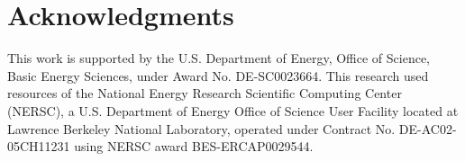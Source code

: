 \documentclass[10pt,a4paper,twocolumn]{article}
\begin{document}
\section{Acknowledgments}
This work is supported by the U.S. Department of Energy, Office of Science, Basic Energy Sciences, under Award No. DE-SC0023664. This research used resources of the National Energy Research Scientific Computing Center (NERSC), a U.S. Department of Energy Office of Science User Facility located at Lawrence Berkeley National Laboratory, operated under Contract No. DE-AC02-05CH11231 using NERSC award BES-ERCAP0029544.


%
\printbibliography

\medskip


\newpage

\appendix



\end{document}
